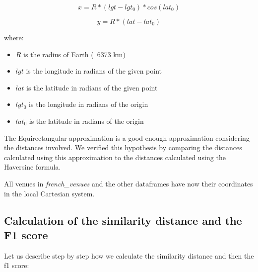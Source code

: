 \documentclass[12pt,a4paper]{article}
\begin{document}
\begin{equation}
	x = R * (lgt - lgt_0) * cos (lat_0)	
\end{equation}

\begin{equation}
	y = R * (lat - lat_0)
\end{equation}

where:

\begin{itemize}
  \item $R$ is the radius of Earth (~6373 km)
  \item $lgt$ is the longitude in radians of the given point
  \item $lat$ is the latitude in radians of the given point
  \item $lgt_0$ is the longitude in radians of the origin
  \item $lat_0$ is the latitude in radians of the origin
\end{itemize}
 
The Equirectangular approximation is a good enough approximation considering the distances involved. We verified this hypothesis by comparing the distances calculated using this approximation to the distances calculated using the Haversine formula.

\medskip

All venues in \textit{french\_venues} and the other dataframes have now their coordinates in the local Cartesian system.
 
\subsection{Calculation of the similarity distance and the F1 score}

Let us describe step by step how we calculate the similarity distance and then the f1 score:
\end{document}
